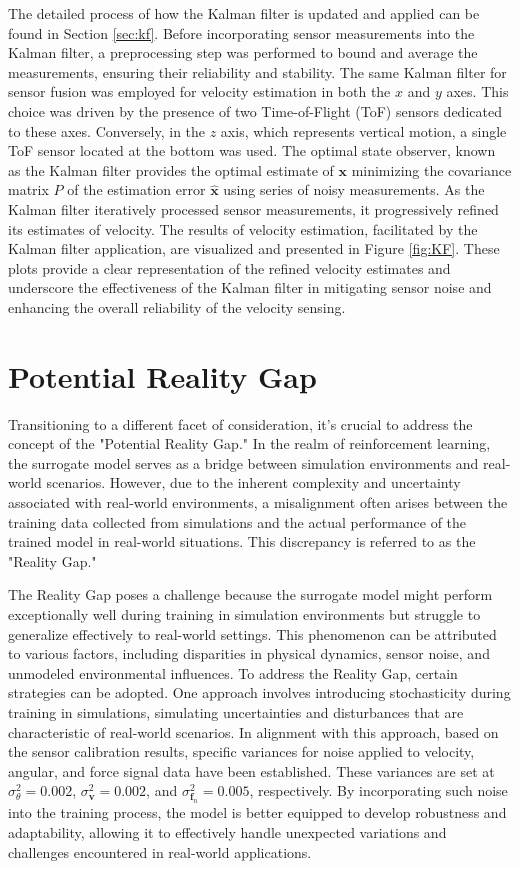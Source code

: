 The detailed process of how the Kalman filter is updated and applied can be found in Section \ref{sec:kf}. Before incorporating sensor measurements into the Kalman filter, a preprocessing step was performed to bound and average the measurements, ensuring their reliability and stability. The same Kalman filter for sensor fusion was employed for velocity estimation in both the $x$ and $y$ axes. This choice was driven by the presence of two Time-of-Flight (ToF) sensors dedicated to these axes. Conversely, in the $z$ axis, which represents vertical motion, a single ToF sensor located at the bottom was used. The optimal state observer, known as the Kalman filter provides the optimal estimate of $\mathbf{x}$ minimizing the covariance matrix $P$ of the estimation error $\hat{\mathbf{x}}$ using series of noisy measurements. As the Kalman filter iteratively processed sensor measurements, it progressively refined its estimates of velocity.  The results of velocity estimation, facilitated by the Kalman filter application, are visualized and presented in Figure \ref{fig:KF}. These plots provide a clear representation of the refined velocity estimates and underscore the effectiveness of the Kalman filter in mitigating sensor noise and enhancing the overall reliability of the velocity sensing.

\section{Potential Reality Gap}
Transitioning to a different facet of consideration, it's crucial to address the concept of the "Potential Reality Gap." In the realm of reinforcement learning, the surrogate model serves as a bridge between simulation environments and real-world scenarios. However, due to the inherent complexity and uncertainty associated with real-world environments, a misalignment often arises between the training data collected from simulations and the actual performance of the trained model in real-world situations. This discrepancy is referred to as the "Reality Gap."

The Reality Gap poses a challenge because the surrogate model might perform exceptionally well during training in simulation environments but struggle to generalize effectively to real-world settings. This phenomenon can be attributed to various factors, including disparities in physical dynamics, sensor noise, and unmodeled environmental influences. To address the Reality Gap, certain strategies can be adopted. One approach involves introducing stochasticity during training in simulations, simulating uncertainties and disturbances that are characteristic of real-world scenarios. In alignment with this approach, based on the sensor calibration results, specific variances for noise applied to velocity, angular, and force signal data have been established. These variances are set at $\sigma_\theta^2 = 0.002$, $\sigma_{\mathbf{v}}^2 = 0.002$, and $\sigma_{\mathbf{f}_n}^2 = 0.005$, respectively. By incorporating such noise into the training process, the model is better equipped to develop robustness and adaptability, allowing it to effectively handle unexpected variations and challenges encountered in real-world applications.

